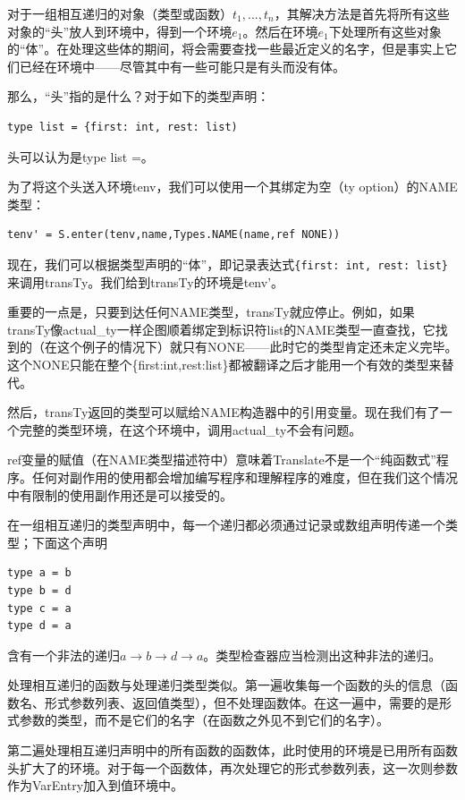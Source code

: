 \documentclass[cn,11pt,chinese]{elegantbook}
\begin{document}
对于一组相互递归的对象（类型或函数）$t_1,...,t_n$，其解决方法是首先将所有这些对象的“头”放人到环境中，得到一个环境$e_1$。然后在环境$e_1$下处理所有这些对象的“体”。在处理这些体的期间，将会需要查找一些最近定义的名字，但是事实上它们已经在环境中——尽管其中有一些可能只是有头而没有体。

那么，“头”指的是什么？对于如下的类型声明：

\begin{lstlisting}
type list = {first: int, rest: list)
\end{lstlisting}

头可以认为是type list =。

为了将这个头送入环境tenv，我们可以使用一个其绑定为空（ty option）的NAME类型：

\begin{lstlisting}
tenv' = S.enter(tenv,name,Types.NAME(name,ref NONE))
\end{lstlisting}

现在，我们可以根据类型声明的“体”，即记录表达式\lstinline|{first: int, rest: list}|来调用transTy。我们给到transTy的环境是tenv'。

重要的一点是，只要到达任何NAME类型，transTy就应停止。例如，如果transTy像actual\_ty一样企图顺着绑定到标识符list的NAME类型一直查找，它找到的（在这个例子的情况下）就只有NONE——此时它的类型肯定还未定义完毕。这个NONE只能在整个\{first:int,rest:list\}都被翻译之后才能用一个有效的类型来替代。

然后，transTy返回的类型可以赋给NAME构造器中的引用变量。现在我们有了一个完整的类型环境，在这个环境中，调用actual\_ty不会有问题。

ref变量的赋值（在NAME类型描述符中）意味着Translate不是一个“纯函数式”程序。任何对副作用的使用都会增加编写程序和理解程序的难度，但在我们这个情况中有限制的使用副作用还是可以接受的。

在一组相互递归的类型声明中，每一个递归都必须通过记录或数组声明传递一个类型；下面这个声明

\begin{lstlisting}
type a = b
type b = d
type c = a
type d = a
\end{lstlisting}

含有一个非法的递归$a\rightarrow b\rightarrow d\rightarrow a$。类型检查器应当检测出这种非法的递归。

处理相互递归的函数与处理递归类型类似。第一遍收集每一个函数的头的信息（函数名、形式参数列表、返回值类型），但不处理函数体。在这一遍中，需要的是形式参数的类型，而不是它们的名字（在函数之外见不到它们的名字）。

第二遍处理相互递归声明中的所有函数的函数体，此时使用的环境是已用所有函数头扩大了的环境。对于每一个函数体，再次处理它的形式参数列表，这一次则参数作为VarEntry加入到值环境中。
\end{document}
